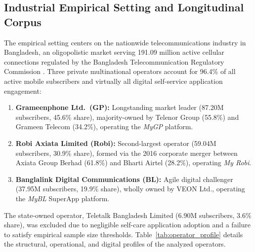 \documentclass[5p,twocolumn,authoryear]{elsarticle}
\begin{document}
\subsection{Industrial Empirical Setting and Longitudinal Corpus}
The empirical setting centers on the nationwide telecommunications industry in Bangladesh, an oligopolistic market serving 191.09 million active cellular connections regulated by the Bangladesh Telecommunication Regulatory Commission \citep[BTRC;][]{btrc2024annual, btrc2026quarterly}. Three private multinational operators account for 96.4\% of all active mobile subscribers and virtually all digital self-service application engagement:
\begin{enumerate}
    \item \textbf{Grameenphone Ltd.\ (GP):} Longstanding market leader (87.20M subscribers, 45.6\% share), majority-owned by Telenor Group (55.8\%) and Grameen Telecom (34.2\%), operating the \textit{MyGP} platform.
    \item \textbf{Robi Axiata Limited (Robi):} Second-largest operator (59.04M subscribers, 30.9\% share), formed via the 2016 corporate merger between Axiata Group Berhad (61.8\%) and Bharti Airtel (28.2\%), operating \textit{My Robi}.
    \item \textbf{Banglalink Digital Communications (BL):} Agile digital challenger (37.95M subscribers, 19.9\% share), wholly owned by VEON Ltd., operating the \textit{MyBL} SuperApp platform.
\end{enumerate}
The state-owned operator, Teletalk Bangladesh Limited (6.90M subscribers, 3.6\% share), was excluded due to negligible self-care application adoption and a failure to satisfy empirical sample size thresholds. Table~\ref{tab:operator_profile} details the structural, operational, and digital profiles of the analyzed operators.
\end{document}
